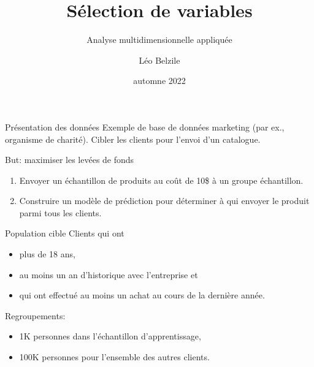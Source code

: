 \documentclass[
  ignorenonframetext,
]{beamer}
\title{Sélection de variables}
\subtitle{Analyse multidimensionnelle appliquée}
\author{Léo Belzile}
\date{automne 2022}
\institute{HEC Montréal}
\providecommand{\tightlist}{%
  \setlength{\itemsep}{0pt}\setlength{\parskip}{0pt}}\usepackage{longtable,booktabs,array}
\begin{document}
\frame{\titlepage}
\ifdefined\Shaded\renewenvironment{Shaded}{\begin{tcolorbox}[enhanced, boxrule=0pt, interior hidden, sharp corners, borderline west={3pt}{0pt}{shadecolor}, breakable, frame hidden]}{\end{tcolorbox}}\fi

\begin{frame}{Présentation des données}
\protect\hypertarget{pruxe9sentation-des-donnuxe9es}{}
Exemple de base de données marketing (par ex., organisme de charité).
Cibler les clients pour l'envoi d'un catalogue.

But: maximiser les levées de fonds

\begin{enumerate}
\tightlist
\item
  Envoyer un échantillon de produits au coût de 10\$ à un groupe
  échantillon.
\item
  Construire un modèle de prédiction pour déterminer à qui envoyer le
  produit parmi tous les clients.
\end{enumerate}
\end{frame}

\begin{frame}{Population cible}
\protect\hypertarget{population-cible}{}
Clients qui ont

\begin{itemize}
\tightlist
\item
  plus de 18 ans,
\item
  au moins un an d'historique avec l'entreprise et
\item
  qui ont effectué au moins un achat au cours de la dernière année.
\end{itemize}

Regroupements:

\begin{itemize}
\tightlist
\item
  1K personnes dans l'échantillon d'apprentissage,
\item
  100K personnes pour l'ensemble des autres clients.
\end{itemize}
\end{frame}
\end{document}
